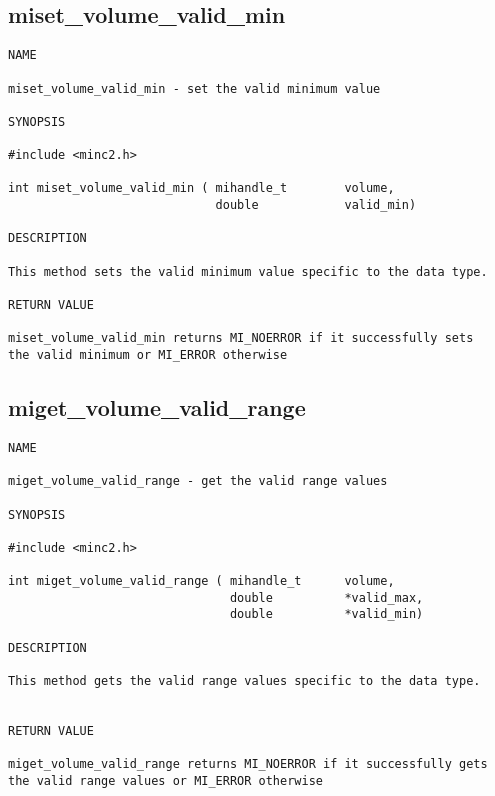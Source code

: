 \documentclass{article}
\begin{document}
\subsection{miset\_volume\_valid\_min}
\begin{verbatim}
NAME 

miset_volume_valid_min - set the valid minimum value 

SYNOPSIS

#include <minc2.h>

int miset_volume_valid_min ( mihandle_t        volume,
                             double            valid_min)
                                
DESCRIPTION

This method sets the valid minimum value specific to the data type.

RETURN VALUE

miset_volume_valid_min returns MI_NOERROR if it successfully sets 
the valid minimum or MI_ERROR otherwise
\end{verbatim}

\subsection{miget\_volume\_valid\_range}
\begin{verbatim}
NAME 

miget_volume_valid_range - get the valid range values

SYNOPSIS

#include <minc2.h>

int miget_volume_valid_range ( mihandle_t      volume,
                               double          *valid_max,
                               double          *valid_min)
                                
DESCRIPTION

This method gets the valid range values specific to the data type.


RETURN VALUE

miget_volume_valid_range returns MI_NOERROR if it successfully gets 
the valid range values or MI_ERROR otherwise
\end{verbatim}
\end{document}

